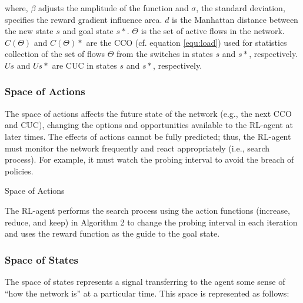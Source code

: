 where, $\beta$ adjusts the amplitude of the function and $\sigma$, the standard deviation, specifies the reward gradient influence area. $d$ is the Manhattan distance between the new state $s$ and goal state $s*$. $\Theta$ is the set of active flows in the network. $C\left ( \Theta  \right ) $ and $C\left ( \Theta  \right )*$ are the CCO (cf. equation \ref{equ:load}) used for statistics collection of the set of flows $\Theta$ from the switches in states $s$ and $s*$, respectively. $Us$ and $Us*$ are CUC in states $s$ and $s*$, respectively.\\

\subsubsection{Space of Actions}
The space of actions affects the future state of the network (e.g., the next CCO and CUC), changing the options and opportunities available to the RL-agent at later times. The effects of actions cannot be fully predicted; thus, the RL-agent must monitor the network frequently and react appropriately (i.e., search process). For example, it must watch the probing interval to avoid the breach of policies.

\newlength{\commentWidth}
\setlength{\commentWidth}{7cm}
\newcommand{\atcp}[1]{\tcp*[r]{\makebox[\commentWidth]{#1\hfill}}}
\begin{english_algorithm}
\footnotesize
\SetAlgoLined
{}

\BlankLine
\label{alg:actions_algorithm}
\caption{Space of Actions}
\end{english_algorithm}

The RL-agent performs the search process using the action functions (increase, reduce, and keep) in Algorithm 2 to change the probing interval in each iteration and uses the reward function as the guide to the goal state.

\subsubsection{Space of States}
The space of states represents a signal transferring to the agent some sense of ``how the network is'' at a particular time. This space is represented as follows:

